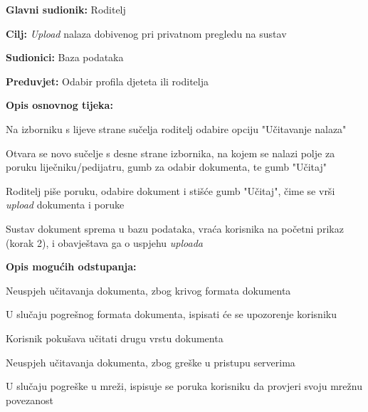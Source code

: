 					\noindent {}
					\begin{packed_item}
						
						\item \textbf{Glavni sudionik: }Roditelj
						\item  \textbf{Cilj:} \textit{Upload} nalaza dobivenog pri privatnom pregledu na sustav
						\item  \textbf{Sudionici:} Baza podataka
						\item  \textbf{Preduvjet:} Odabir profila djeteta ili roditelja
						\item  \textbf{Opis osnovnog tijeka:}
						
						\item[] \begin{packed_enum}
							
							\item Na izborniku s lijeve strane sučelja roditelj odabire opciju "Učitavanje nalaza"
							\item Otvara se novo sučelje s desne strane izbornika, na kojem se nalazi polje za poruku liječniku/pedijatru, gumb za odabir dokumenta, te gumb "Učitaj"
							\item Roditelj piše poruku, odabire dokument i stišće gumb "Učitaj", čime se vrši \textit{upload} dokumenta i poruke
							\item Sustav dokument sprema u bazu podataka, vraća korisnika na početni prikaz (korak 2), i obavještava ga o uspjehu \textit{uploada}
						\end{packed_enum}
						
						\item  \textbf{Opis mogućih odstupanja:}
						
						\item[] \begin{packed_item}
							\item[3.a] Neuspjeh učitavanja dokumenta, zbog krivog formata dokumenta
							\item[] \begin{packed_enum}
								\item U slučaju pogrešnog formata dokumenta, ispisati će se upozorenje korisniku
								\item Korisnik pokušava učitati drugu vrstu dokumenta
							\end{packed_enum}
							\item[3.b] Neuspjeh učitavanja dokumenta, zbog greške u pristupu serverima
							\item[] \begin{packed_enum}
								\item U slučaju pogreške u mreži, ispisuje se poruka korisniku da provjeri svoju mrežnu povezanost
							\end{packed_enum}
							
						\end{packed_item}
					\end{packed_item}
					
